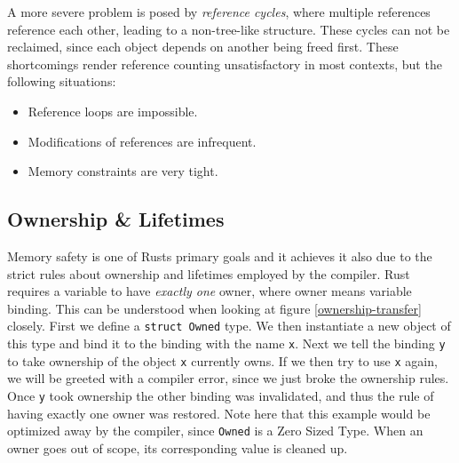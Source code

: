 \documentclass[twocolumn]{article}
\begin{document}
A more severe problem is posed by \textit{reference cycles}, where multiple references reference each other, leading to a non-tree-like structure.
These cycles can not be reclaimed, since each object depends on another being freed first.
These shortcomings render reference counting unsatisfactory in most contexts, but the following situations:
\begin{itemize}
        \item Reference loops are impossible.
        \item Modifications of references are infrequent.
        \item Memory constraints are very tight.
\end{itemize}
\subsection{Ownership \& Lifetimes}
\label{ownership}
Memory safety is one of Rusts primary goals and it achieves it also due to the strict rules about ownership and lifetimes employed by the compiler.
Rust requires a variable to have \textit{exactly one} owner, where owner means variable binding.
This can be understood when looking at figure \ref{ownership-transfer} closely.
First we define a \texttt{struct Owned} type.
We then instantiate a new object of this type and bind it to the binding with the name \texttt{x}.
Next we tell the binding \texttt{y} to take ownership of the object \texttt{x} currently owns.
If we then try to use \texttt{x} again, we will be greeted with a compiler error, since we just broke the ownership rules.
Once \texttt{y} took ownership the other binding was invalidated, and thus the rule of having exactly one owner was restored.
Note here that this example would be optimized away by the compiler, since \texttt{Owned} is a Zero Sized Type\cite{Nomicon-ZST}.
When an owner goes out of scope, its corresponding value is cleaned up.
\end{document}
